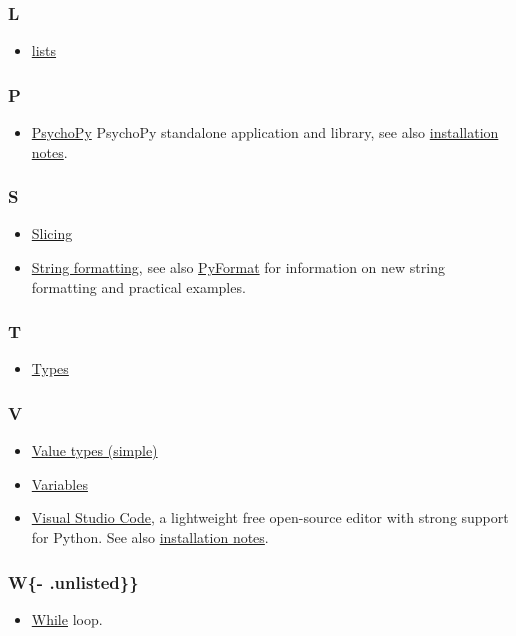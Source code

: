 \documentclass[
]{book}
\providecommand{\tightlist}{%
  \setlength{\itemsep}{0pt}\setlength{\parskip}{0pt}}
\begin{document}
\hypertarget{l}{%
\subsubsection*{L}\label{l}}

\begin{itemize}
\tightlist
\item
  \protect\hyperlink{lists}{lists}
\end{itemize}

\hypertarget{p}{%
\subsubsection*{P}\label{p}}

\begin{itemize}
\tightlist
\item
  \href{https://www.psychopy.org/}{PsychoPy} PsychoPy standalone application and library, see also \protect\hyperlink{install-psychopy}{installation notes}.
\end{itemize}

\hypertarget{s}{%
\subsubsection*{S}\label{s}}

\begin{itemize}
\tightlist
\item
  \protect\hyperlink{lists}{Slicing}
\item
  \protect\hyperlink{string-formatting}{String formatting}, see also \href{https://pyformat.info/}{PyFormat} for information on new string formatting and practical examples.
\end{itemize}

\hypertarget{t}{%
\subsubsection*{T}\label{t}}

\begin{itemize}
\tightlist
\item
  \protect\hyperlink{value-types}{Types}
\end{itemize}

\hypertarget{v}{%
\subsubsection*{V}\label{v}}

\begin{itemize}
\item
  \protect\hyperlink{value-types}{Value types (simple)}
\item
  \protect\hyperlink{variables}{Variables}
\item
  \href{https://code.visualstudio.com/}{Visual Studio Code}, a lightweight free open-source editor with strong support for Python. See also \protect\hyperlink{install-vs-code}{installation notes}.
\end{itemize}

\hypertarget{w--.unlisted}{%
\subsubsection{W\{- .unlisted\}\}}\label{w--.unlisted}}

\begin{itemize}
\tightlist
\item
  \protect\hyperlink{while-loop}{While} loop.
\end{itemize}
\end{document}
